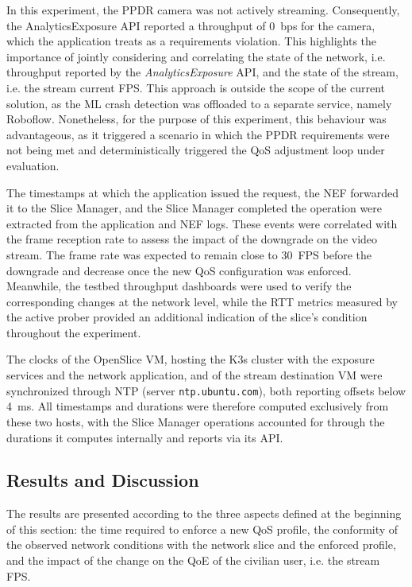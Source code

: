 In this experiment, the \acs{PPDR} camera was not actively streaming. Consequently, the AnalyticsExposure \acs{API} reported a throughput of 0~bps for the camera, which the application treats as a requirements violation. This highlights the importance of jointly considering and correlating the state of the network, i.e. throughput reported by the \textit{AnalyticsExposure} \acs{API}, and the state of the stream, i.e. the stream current \acs{FPS}. This approach is outside the scope of the current solution, as the \acs{ML} crash detection was offloaded to a separate service, namely Roboflow. Nonetheless, for the purpose of this experiment, this behaviour was advantageous, as it triggered a scenario in which the \acs{PPDR} requirements were not being met and deterministically triggered the \acs{QoS} adjustment loop under evaluation.

The timestamps at which the application issued the request, the \acs{NEF} forwarded it to the Slice Manager, and the Slice Manager completed the operation were extracted from the application and \acs{NEF} logs. These events were correlated with the frame reception rate to assess the impact of the downgrade on the video stream. The frame rate was expected to remain close to 30~\acs{FPS} before the downgrade and decrease once the new \acs{QoS} configuration was enforced. Meanwhile, the testbed throughput dashboards were used to verify the corresponding changes at the network level, while the \acs{RTT} metrics measured by the active prober provided an additional indication of the slice's condition throughout the experiment.

The clocks of the OpenSlice \acs{VM}, hosting the K3s cluster with the exposure services and the network application, and of the stream destination \acs{VM} were synchronized through \acs{NTP} (server \texttt{ntp.ubuntu.com}), both reporting offsets below 4~ms. All timestamps and durations were therefore computed exclusively from these two hosts, with the Slice Manager operations accounted for through the durations it computes internally and reports via its \acs{API}.

\subsection{Results and Discussion}
\label{chap:results:use-case:discussion}

The results are presented according to the three aspects defined at the beginning of this section: the time required to enforce a new \acs{QoS} profile, the conformity of the observed network conditions with the network slice and the enforced profile, and the impact of the change on the \acs{QoE} of the civilian user, i.e. the stream \acs{FPS}.

